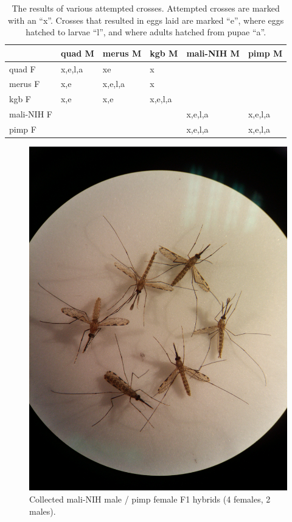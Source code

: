 \documentclass{article}
\begin{document}
\begin{table}[]
\centering
\begin{tabular}{|l|l|l|l|l|l|}
\hline
           & quad M  & merus M  & kgb M  & mali-NIH M & pimp M     \\ \hline
quad F     & x,e,l,a  & xe      & x       &           &            \\ \hline
merus F    & x,e      & x,e,l,a & x       &           &            \\ \hline
kgb F      & x,e      & x,e     & x,e,l,a &           &            \\ \hline
mali-NIH F &          &         &         & x,e,l,a   & x,e,l,a    \\ \hline
pimp F     &          &         &         & x,e,l,a   & x,e,l,a    \\ \hline
\end{tabular}
\caption{The results of various attempted crosses. Attempted crosses are marked with an ``x''. Crosses that resulted in eggs laid are marked ``e'', where eggs hatched to larvae ``l'', and where adults hatched from pupae ``a''.}
\label{tab:crosses}
\end{table}
{}



\begin{figure}[p]
\includegraphics[scale=0.1, angle=90]{mali-NIH-♂_pimp-♀}
\caption{Collected mali-NIH male / pimp female F1 hybrids (4 females, 2 males).}
\label{fig:malimalepimpfemale}
\end{figure}
\end{document}
